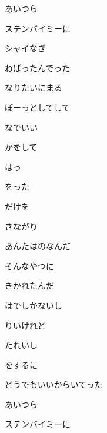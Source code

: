 \documentclass[a4paper,tate,twocolumn,12pt]{ltjtarticle}
\begin{document}
\begin{flushleft}
\begin{minipage}{\linewidth}
あいつら

ステンバイミーに

シャイなぎ

ねばったんでった

なりたいにまる

ぼーっとしてして

なでいい
\end{minipage}

\vspace{2em}

\noindent\begin{minipage}{\linewidth}
かをして

はっ

をった

だけを


さながり

あんたはのなんだ

そんなやつに

きかれたんだ
\end{minipage}

\vspace{2em}

\noindent\begin{minipage}{\linewidth}
はでしかないし

りいけれど

たれいし

をするに
\end{minipage}

\vspace{2em}

\noindent\begin{minipage}{\linewidth}
どうでもいいからいてった

あいつら

ステンバイミーに


\end{minipage}
\end{flushleft}
\end{document}
